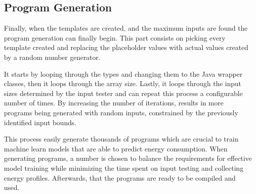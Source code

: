 \subsection{Program Generation} \label{sec:work_stage1_program_generation}

Finally, when the templates are created, and the maximum inputs are found the program generation can finally begin. This part consists on picking every template created and replacing the placeholder values with actual values created by a random number generator.

It starts by looping through the types and changing them to the Java wrapper classes, then it loops through the array size. Lastly, it loops through the input sizes determined by the input tester and can repeat this process a configurable number of times. By increasing the number of iterations, results in more programs being generated with random inputs, constrained by the previously identified input bounds.

This process easily generate thousands of programs which are crucial to train machine learn models that are able to predict energy consumption. When generating programs, a number is chosen to balance the requirements for effective model training while minimizing the time spent on input testing and collecting energy profiles. Afterwards, that the programs are ready to be compiled and used.